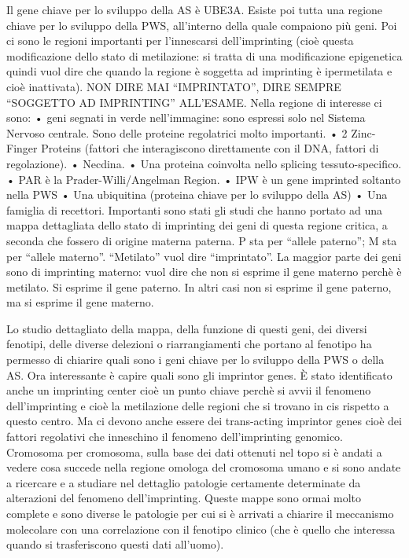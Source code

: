 \documentclass[11pt]{book}
\begin{document}
Il gene chiave per lo sviluppo della AS è UBE3A. Esiste poi tutta una regione chiave per lo sviluppo della PWS, all’interno della quale compaiono più geni. Poi ci sono le regioni importanti per l’innescarsi dell’imprinting (cioè questa modificazione dello stato di metilazione: si tratta di una modificazione epigenetica quindi vuol dire che quando la regione è soggetta ad imprinting è ipermetilata e cioè inattivata).
NON DIRE MAI “IMPRINTATO”, DIRE SEMPRE “SOGGETTO AD IMPRINTING” ALL’ESAME.
Nella regione di interesse ci sono:
    • geni segnati in verde nell’immagine: sono espressi solo nel Sistema Nervoso centrale. Sono delle proteine regolatrici molto importanti.
    • 2 Zinc-Finger Proteins (fattori che interagiscono direttamente con il DNA, fattori di regolazione). 
    • Necdina.
    • Una proteina coinvolta nello splicing tessuto-specifico.
    • PAR è la Prader-Willi/Angelman Region.
    • IPW è un gene imprinted soltanto nella PWS
    • Una ubiquitina (proteina chiave per lo sviluppo della AS)
    • Una famiglia di recettori.
Importanti sono stati gli studi che hanno portato ad una mappa dettagliata dello stato di imprinting dei geni di questa regione critica, a seconda che fossero di origine materna  paterna.
P sta per “allele paterno”; M sta per “allele materno”. “Metilato” vuol dire “imprintato”. 
La maggior parte dei geni sono di imprinting materno: vuol dire che non si esprime il gene materno perchè è metilato. Si esprime il gene paterno. 
In altri casi non si esprime il gene paterno, ma si esprime il gene materno.

Lo studio dettagliato della mappa, della funzione di questi geni, dei diversi fenotipi, delle diverse delezioni o riarrangiamenti che portano al fenotipo ha permesso di chiarire quali sono i geni chiave per lo sviluppo della PWS o della AS.
Ora interessante è capire quali sono gli imprintor genes. 
È stato identificato anche un imprinting center cioè un punto chiave perchè si avvii il fenomeno dell’imprinting e cioè la metilazione delle regioni che si trovano in cis rispetto a questo centro. Ma ci devono anche essere dei trans-acting imprintor genes cioè dei fattori regolativi che inneschino il fenomeno dell’imprinting genomico.
Cromosoma per cromosoma, sulla base dei dati ottenuti nel topo si è andati a vedere cosa succede nella regione omologa del cromosoma umano e si sono andate a ricercare e a studiare nel dettaglio patologie certamente determinate da alterazioni del fenomeno dell’imprinting. Queste mappe sono ormai molto complete e sono diverse le patologie per cui si è arrivati a chiarire il meccanismo molecolare con una correlazione con il fenotipo clinico (che è quello che interessa quando si trasferiscono questi dati all’uomo).
\end{document}
